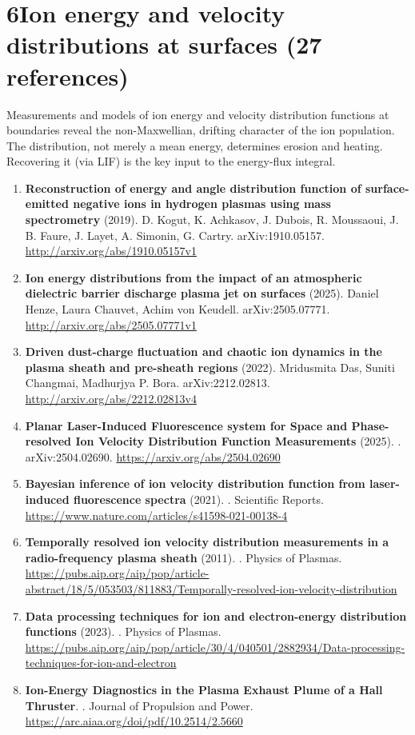 \documentclass[11pt,a4paper]{article}
\begin{document}
\section*{6\quad Ion energy and velocity distributions at surfaces \textnormal{(\normalsize 27 references)}}
Measurements and models of ion energy and velocity distribution functions at boundaries reveal the non-Maxwellian, drifting character of the ion population. The distribution, not merely a mean energy, determines erosion and heating. Recovering it (via LIF) is the key input to the energy-flux integral.
\begin{enumerate}[leftmargin=1.4em]
\item \textbf{Reconstruction of energy and angle distribution function of surface-emitted negative ions in hydrogen plasmas using mass spectrometry} (2019). D. Kogut, K. Achkasov, J. Dubois, R. Moussaoui, J. B. Faure, J. Layet, A. Simonin, G. Cartry. arXiv:1910.05157. \url{http://arxiv.org/abs/1910.05157v1}
\item \textbf{Ion energy distributions from the impact of an atmospheric dielectric barrier discharge plasma jet on surfaces} (2025). Daniel Henze, Laura Chauvet, Achim von Keudell. arXiv:2505.07771. \url{http://arxiv.org/abs/2505.07771v1}
\item \textbf{Driven dust-charge fluctuation and chaotic ion dynamics in the plasma sheath and pre-sheath regions} (2022). Mridusmita Das, Suniti Changmai, Madhurjya P. Bora. arXiv:2212.02813. \url{http://arxiv.org/abs/2212.02813v4}
\item \textbf{Planar Laser-Induced Fluorescence system for Space and Phase-resolved Ion Velocity Distribution Function Measurements} (2025). . arXiv:2504.02690. \url{https://arxiv.org/abs/2504.02690}
\item \textbf{Bayesian inference of ion velocity distribution function from laser-induced fluorescence spectra} (2021). . Scientific Reports. \url{https://www.nature.com/articles/s41598-021-00138-4}
\item \textbf{Temporally resolved ion velocity distribution measurements in a radio-frequency plasma sheath} (2011). . Physics of Plasmas. \url{https://pubs.aip.org/aip/pop/article-abstract/18/5/053503/811883/Temporally-resolved-ion-velocity-distribution}
\item \textbf{Data processing techniques for ion and electron-energy distribution functions} (2023). . Physics of Plasmas. \url{https://pubs.aip.org/aip/pop/article/30/4/040501/2882934/Data-processing-techniques-for-ion-and-electron}
\item \textbf{Ion-Energy Diagnostics in the Plasma Exhaust Plume of a Hall Thruster}. . Journal of Propulsion and Power. \url{https://arc.aiaa.org/doi/pdf/10.2514/2.5660}

\end{enumerate}
\end{document}
